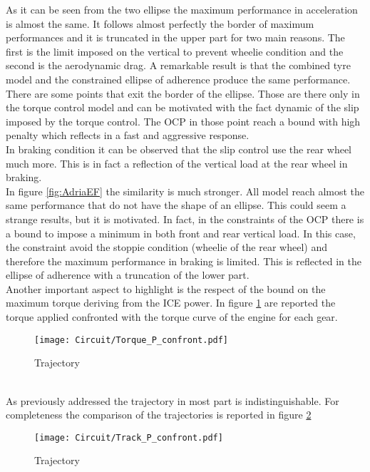 %
As it can be seen from the two ellipse the maximum performance in acceleration is almost the same. It follows almost perfectly the border of maximum performances and it is truncated in the upper part for two main reasons. The first is the limit imposed on the vertical to prevent wheelie condition and the second is the aerodynamic drag. A remarkable result is that the combined tyre model and the constrained ellipse of adherence produce the same performance.\\
There are some points that exit the border of the ellipse. Those are there only in the torque control model and can be motivated with the fact dynamic of the slip imposed by the torque control. The OCP in those point reach a bound with high penalty which reflects in a fast and aggressive response.\\
In braking condition it can be observed that the slip control use the rear wheel much more. This is in fact a reflection of the vertical load at the rear wheel in braking.\\
%
In figure \ref{fig:AdriaEF} the similarity is much stronger. All model reach almost the same performance that do not have the shape of an ellipse. This could seem a strange results, but it is motivated. In fact, in the constraints of the OCP there is a bound to impose a minimum in both front and rear vertical load. In this case, the constraint avoid the stoppie condition (wheelie of the rear wheel) and therefore the maximum performance in braking is limited. This is reflected in the ellipse of adherence with a truncation of the lower part.\\
Another important aspect to highlight is the respect of the bound on the maximum torque deriving from the ICE power. In figure \ref{fig:AdriaTorqueConfront} are reported the torque applied confronted with the torque curve of the engine for each gear.\\
%
\begin{figure}[!htb]
    \centering
    \texttt{[image: Circuit/Torque\_P\_confront.pdf]}
    \caption{Trajectory}
    \label{fig:AdriaTorqueConfront}
\end{figure}\\
%
%
As previously addressed the trajectory in most part is indistinguishable. For completeness the comparison of the trajectories is reported in figure \ref{fig:AdriaTrajConfront}
%
\begin{figure}[!h]
    \centering
    \texttt{[image: Circuit/Track\_P\_confront.pdf]}
    \caption{Trajectory}
    \label{fig:AdriaTrajConfront}
\end{figure}
%
\clearpage
%